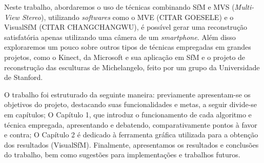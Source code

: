 \documentclass[a4paper,12pt,oneside,onecolumn,final,fleqn]{repUERJ}
\theoremstyle{plain}
\theoremstyle{definition}
\begin{document}
Neste trabalho, abordaremos o uso de técnicas combinando SfM e MVS ({\it Multi-View Stereo}), utilizando {\it softwares} como o MVE (CITAR GOESELE) e o VisualSfM (CITAR CHANGCHANGWU), é possível gerar uma reconstrução satisfatória apenas utilizando uma câmera de um {\it smartphone}. Além disso exploraremos um pouco sobre outros tipos de técnicas empregadas em grandes projetos, como o Kinect, da Microsoft e sua aplicação em SfM e o projeto de reconstrução das esculturas de Michelangelo, feito por um grupo da Universidade de Stanford.


O trabalho foi estruturado da seguinte maneira: previamente apresentam-se os objetivos do projeto, destacando suas funcionalidades e metas, a seguir divide-se em capítulos; O Capítulo 1, que introduz o funcionamento de cada algoritmo e técnica empregada, apresentando e debatendo, comparativamente pontos à favor e contra; O Capítulo 2 é dedicado à ferramenta gráfica utilizada para a obtenção dos resultados (VisualSfM). Finalmente, apresentamos os resultados e conclusões do trabalho, bem como sugestões para implementações e trabalhos futuros.



\imprimirchaves




\end{document}

